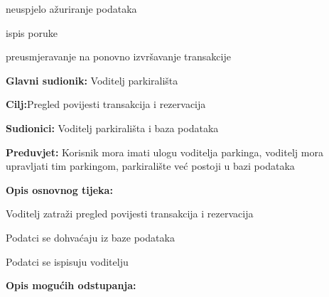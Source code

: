 \begin{packed_item}
\begin{packed_item}
\begin{packed_item}
\begin{packed_enum}
    					\end{packed_enum}
    					\item[3.a] neuspjelo ažuriranje podataka
						\item[] \begin{packed_enum}
							
							\item ispis poruke
							\item preusmjeravanje na ponovno izvršavanje transakcije
							
						\end{packed_enum}
    					
    				\end{packed_item}
    			\end{packed_item}
    				\noindent {}
    				\begin{packed_item}
    					
    					\item \textbf{Glavni sudionik: }Voditelj parkirališta
    					\item  \textbf{Cilj:}Pregled povijesti transakcija i rezervacija 
    					\item  \textbf{Sudionici:} Voditelj parkirališta i baza podataka
    					\item  \textbf{Preduvjet:} Korisnik mora imati ulogu voditelja parkinga, voditelj mora upravljati tim parkingom, parkiralište već postoji u bazi podataka
    					\item  \textbf{Opis osnovnog tijeka:}
    					
    					\item[] \begin{packed_enum}
    						
    						\item Voditelj zatraži pregled povijesti transakcija i rezervacija
    						\item Podatci se dohvaćaju iz baze podataka
    						\item Podatci se ispisuju voditelju
    						
    					\end{packed_enum}
    					
    					\item  \textbf{Opis mogućih odstupanja:}
    					
    					\item[] \begin{packed_item}
    						

\end{packed_item}
\end{packed_item}
\end{packed_item}
